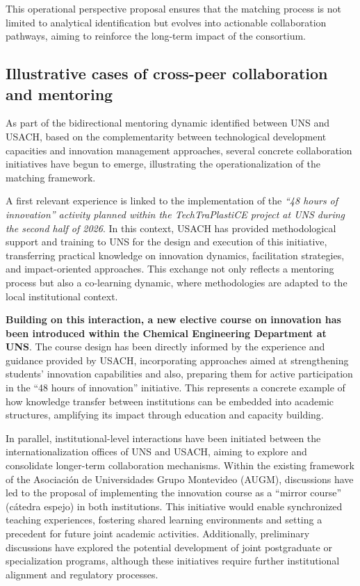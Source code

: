 \documentclass[
  12pt,
  oneside]{book}
\begin{document}
This operational perspective proposal ensures that the matching process
is not limited to analytical identification but evolves into actionable
collaboration pathways, aiming to reinforce the long-term impact of the
consortium.

\subsection{Illustrative cases of cross-peer collaboration and
mentoring}\label{illustrative-cases-of-cross-peer-collaboration-and-mentoring}

As part of the bidirectional mentoring dynamic identified between UNS
and USACH, based on the complementarity between technological
development capacities and innovation management approaches, several
concrete collaboration initiatives have begun to emerge, illustrating
the operationalization of the matching framework.

A first relevant experience is linked to the implementation of the
\emph{``48 hours of innovation'' activity planned within the
TechTraPlastiCE project at UNS during the second half of 2026}. In this
context, USACH has provided methodological support and training to UNS
for the design and execution of this initiative, transferring practical
knowledge on innovation dynamics, facilitation strategies, and
impact-oriented approaches. This exchange not only reflects a mentoring
process but also a co-learning dynamic, where methodologies are adapted
to the local institutional context.

\textbf{Building on this interaction, a new elective course on
innovation has been introduced within the Chemical Engineering
Department at UNS}. The course design has been directly informed by the
experience and guidance provided by USACH, incorporating approaches
aimed at strengthening students' innovation capabilities and also,
preparing them for active participation in the ``48 hours of
innovation'' initiative. This represents a concrete example of how
knowledge transfer between institutions can be embedded into academic
structures, amplifying its impact through education and capacity
building.

In parallel, institutional-level interactions have been initiated
between the internationalization offices of UNS and USACH, aiming to
explore and consolidate longer-term collaboration mechanisms. Within the
existing framework of the Asociación de Universidades Grupo Montevideo
(AUGM), discussions have led to the proposal of implementing the
innovation course as a ``mirror course'' (cátedra espejo) in both
institutions. This initiative would enable synchronized teaching
experiences, fostering shared learning environments and setting a
precedent for future joint academic activities. Additionally,
preliminary discussions have explored the potential development of joint
postgraduate or specialization programs, although these initiatives
require further institutional alignment and regulatory processes.
\end{document}
